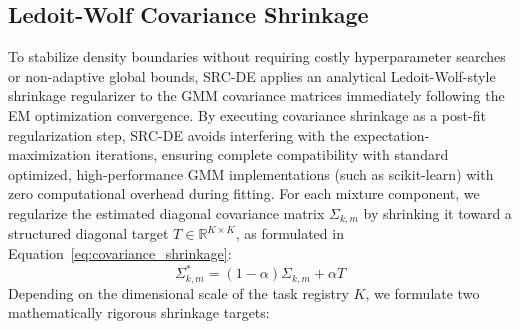 \subsection{Ledoit-Wolf Covariance Shrinkage}
To stabilize density boundaries without requiring costly hyperparameter searches or non-adaptive global bounds, SRC-DE applies an analytical Ledoit-Wolf-style shrinkage regularizer to the GMM covariance matrices immediately following the EM optimization convergence. By executing covariance shrinkage as a post-fit regularization step, SRC-DE avoids interfering with the expectation-maximization iterations, ensuring complete compatibility with standard optimized, high-performance GMM implementations (such as scikit-learn) with zero computational overhead during fitting. For each mixture component, we regularize the estimated diagonal covariance matrix $\Sigma_{k, m}$ by shrinking it toward a structured diagonal target $T \in \mathbb{R}^{K \times K}$, as formulated in Equation~\ref{eq:covariance_shrinkage}:
\begin{equation}
\label{eq:covariance_shrinkage}
    \Sigma^{*}_{k, m} = (1 - \alpha) \Sigma_{k, m} + \alpha T
\end{equation}
Depending on the dimensional scale of the task registry $K$, we formulate two mathematically rigorous shrinkage targets:
